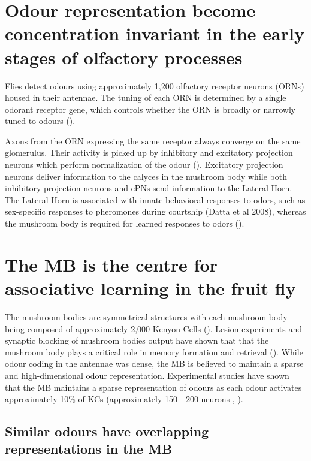 \section{Odour representation become concentration invariant in the early
stages of olfactory processes }

Flies detect odours using approximately 1,200 olfactory receptor neurons
(ORNs) housed in their antennae. The tuning of each ORN is determined
by a single odorant receptor gene, which controls whether the ORN
is broadly or narrowly tuned to odours (\citealp{Hallem:2006iu}).

Axons from the ORN expressing the same receptor always converge on
the same glomerulus. Their activity is picked up by inhibitory and
excitatory projection neurons which perform normalization of the odour
(\citealp{Luo:2010fb}). Excitatory projection neurons deliver information
to the calyces in the mushroom body while both inhibitory projection
neurons and ePNs send information to the Lateral Horn. The Lateral
Horn is associated with innate behavioral responses to odors, such
as sex-specific responses to pheromones during courtship (Datta et
al 2008), whereas the mushroom body is required for learned responses
to odors (\citealp{deBelle:1994iu}).


\section{The MB is the centre for associative learning in the fruit fly}

The mushroom bodies are symmetrical structures with each mushroom
body being composed of approximately 2,000 Kenyon Cells (\citealp{Turner:2008eo}).
Lesion experiments and synaptic blocking of mushroom bodies output
have shown that that the mushroom body plays a critical role in memory
formation and retrieval (\citealp{Heisenberg:2009bu}). While odour
coding in the antennae was dense, the MB is believed to maintain a
sparse and high-dimensional odour representation. Experimental studies
have shown that the MB maintains a sparse representation of odours
as each odour activates approximately 10\% of KCs (approximately 150
- 200 neurons , \citealp{Honegger:2011ja}). 


\subsection{Similar odours have overlapping representations in the MB}

